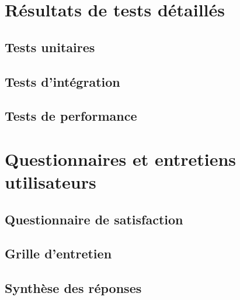 \begin{appendices}
    \chapter{Résultats de tests détaillés}

    \section{Tests unitaires}

    \section{Tests d'intégration}

    \section{Tests de performance}

    \chapter{Questionnaires et entretiens utilisateurs}

    \section{Questionnaire de satisfaction}

    \section{Grille d'entretien}

    \section{Synthèse des réponses}

\end{appendices}